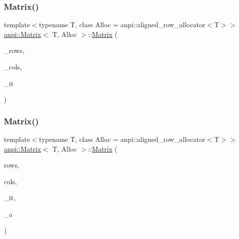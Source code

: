 \subsubsection{\texorpdfstring{Matrix()}{Matrix()}\hspace{0.1cm}{\footnotesize\ttfamily [3/17]}}
{\footnotesize\ttfamily template$<$typename T, class Alloc = anpi\+::aligned\+\_\+row\+\_\+allocator$<$\+T$>$$>$ \\
\hyperlink{classanpi_1_1Matrix}{anpi\+::\+Matrix}$<$ T, Alloc $>$\+::\hyperlink{classanpi_1_1Matrix}{Matrix} (\begin{DoxyParamCaption}\item[{const size\+\_\+t}]{\+\_\+rows,  }\item[{const size\+\_\+t}]{\+\_\+cols,  }\item[{const \hyperlink{namespaceanpi_a57664960c64a6275e3bf1c70d6fab177}{Initialization\+Type}}]{\+\_\+it }\end{DoxyParamCaption})\hspace{0.3cm}{\ttfamily [explicit]}}

\mbox{\label{classanpi_1_1Matrix_ac5498f0ddd9149751d99ce04d2a33e38}} 
\subsubsection{\texorpdfstring{Matrix()}{Matrix()}\hspace{0.1cm}{\footnotesize\ttfamily [4/17]}}
{\footnotesize\ttfamily template$<$typename T, class Alloc = anpi\+::aligned\+\_\+row\+\_\+allocator$<$\+T$>$$>$ \\
\hyperlink{classanpi_1_1Matrix}{anpi\+::\+Matrix}$<$ T, Alloc $>$\+::\hyperlink{classanpi_1_1Matrix}{Matrix} (\begin{DoxyParamCaption}\item[{const size\+\_\+t}]{rows,  }\item[{const size\+\_\+t}]{cols,  }\item[{const \hyperlink{namespaceanpi_a57664960c64a6275e3bf1c70d6fab177}{Initialization\+Type}}]{\+\_\+it,  }\item[{const \hyperlink{classanpi_1_1Matrix_a3574b7528e3ddfb2f7cdf446be8286c1}{allocator\+\_\+type} \&}]{\+\_\+a }\end{DoxyParamCaption})\hspace{0.3cm}{\ttfamily [explicit]}}

